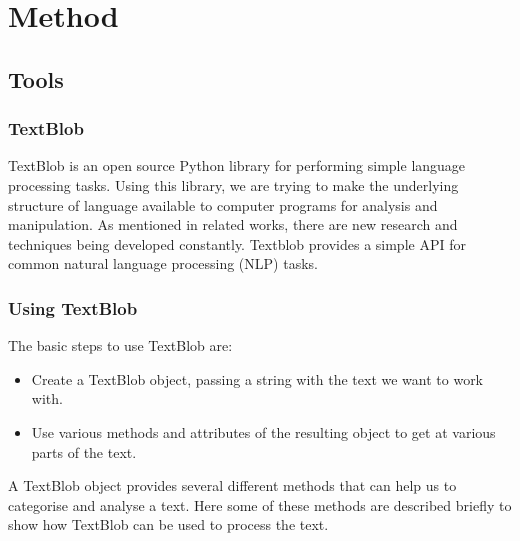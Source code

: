 \documentclass[a4paper]{article}
\begin{document}
 



\section*{Method}  
\subsection{Tools}  
\subsubsection{TextBlob}
TextBlob is an open source Python library for performing simple  language processing tasks. Using this library, we are trying to make  the underlying structure of language available to computer programs for analysis and manipulation. {\color{red} As mentioned in related works, there are new research and techniques being developed constantly.} Textblob provides a simple API for common natural language processing (NLP) tasks. 



\subsubsection{Using TextBlob}

The basic steps to use TextBlob are:

\begin{itemize}  
\item Create a TextBlob object, passing a string with the text we want to work with.
\item Use various methods and attributes of the resulting object to get at various parts of the text.
\end{itemize}

A TextBlob object provides several different methods that can help us to categorise and analyse a text. Here some of these methods are described briefly to show how TextBlob can be used to process the text. 
\end{document}
